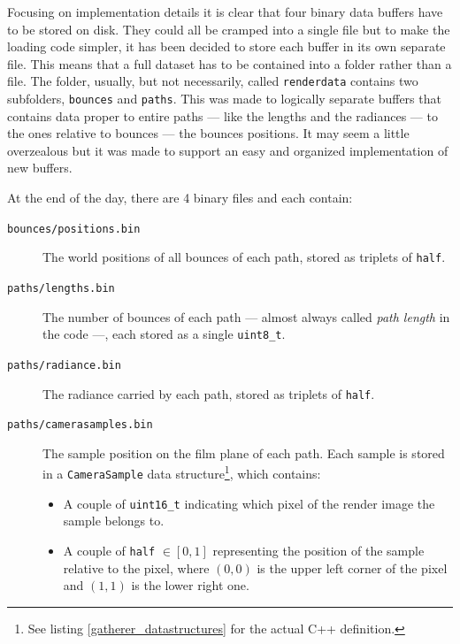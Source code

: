 Focusing on implementation details it is clear that four binary data buffers have to be stored on disk. They could all be cramped into a single file but to make the loading code simpler, it has been decided to store each buffer in its own separate file.
This means that a full dataset has to be contained into a folder rather than a file. The folder, usually, but not necessarily, called \texttt{renderdata} contains two subfolders, \texttt{bounces} and \texttt{paths}.
This was made to logically separate buffers that contains data proper to entire paths --- like the lengths and the radiances --- to the ones relative to bounces --- the bounces positions. It may seem a little overzealous but it was made to support an easy and organized implementation of new buffers.

At the end of the day, there are 4 binary files and each contain:
\begin{description}
	\item[\texttt{bounces/positions.bin}] The world positions of all bounces of each path, stored as triplets of \texttt{half}.
	\item[\texttt{paths/lengths.bin}] The number of bounces of each path --- almost always called \textit{path length} in the code ---, each stored as a single \texttt{uint8\_t}.
	\item[\texttt{paths/radiance.bin}] The radiance carried by each path, stored as triplets of \texttt{half}.
	\item[\texttt{paths/camerasamples.bin}] The sample position on the film plane of each path. Each sample is stored in a \texttt{CameraSample} data structure\footnote{See listing \ref{gatherer_datastructures} for the actual C++ definition.}, which contains:
	\begin{itemize}
		\item A couple of \texttt{uint16\_t} indicating which pixel of the render image the sample belongs to.
		\item A couple of \texttt{half} $\in [0, 1]$ representing the position of the sample relative to the pixel, where $(0,0)$ is the upper left corner of the pixel and $(1,1)$ is the lower right one.
	\end{itemize} 
\end{description}


